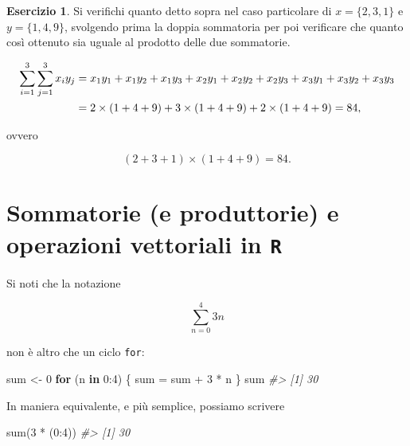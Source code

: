 \documentclass[
  11pt,
]{krantz}
\makeatletter
\newenvironment{Shaded}{\begin{snugshade}}{\end{snugshade}}
\newcommand{\CommentTok}[1]{\textcolor[rgb]{0.37,0.37,0.37}{\textit{#1}}}
\newcommand{\ControlFlowTok}[1]{\textcolor[rgb]{0.27,0.27,0.27}{\textbf{#1}}}
\newcommand{\DecValTok}[1]{\textcolor[rgb]{0.06,0.06,0.06}{#1}}
\newcommand{\FunctionTok}[1]{\textcolor[rgb]{0,0,0}{#1}}
\newcommand{\NormalTok}[1]{#1}
\newcommand{\OtherTok}[1]{\textcolor[rgb]{0.37,0.37,0.37}{#1}}
\newcommand{\SpecialCharTok}[1]{\textcolor[rgb]{0,0,0}{#1}}
\newenvironment{kframe}{%
\medskip{}
\setlength{\fboxsep}{.8em}
 \def\at@end@of@kframe{}%
 \ifinner\ifhmode%
  \def\at@end@of@kframe{\end{minipage}}%
  \begin{minipage}{\columnwidth}%
 \fi\fi%
 \def\FrameCommand##1{\hskip\@totalleftmargin \hskip-\fboxsep
 \colorbox{shadecolor}{##1}\hskip-\fboxsep
     \hskip-\linewidth \hskip-\@totalleftmargin \hskip\columnwidth}%
 \MakeFramed {\advance\hsize-\width
   \@totalleftmargin\z@ \linewidth\hsize
   \@setminipage}}%
 {\par\unskip\endMakeFramed%
 \at@end@of@kframe}
\renewenvironment{Shaded}{\begin{kframe}}{\end{kframe}}
\theoremstyle{definition}
\theoremstyle{definition}
\theoremstyle{definition}
\newtheorem{exercise}{Esercizio}[chapter]
\theoremstyle{definition}
\theoremstyle{remark}
\makeatother
\begin{document}
\begin{exercise}
Si verifichi quanto detto sopra nel caso particolare di \(x = \{2, 3, 1\}\) e \(y = \{1, 4, 9\}\), svolgendo prima la doppia sommatoria per poi verificare che quanto così ottenuto sia uguale al prodotto delle due sommatorie.

\begin{align}
\sum_{i=1}^3 \sum_{j=1}^3 x_i y_j &= x_1y_1 + x_1y_2 + x_1y_3 + 
x_2y_1 + x_2y_2 + x_2y_3 + 
x_3y_1 + x_3y_2 + x_3y_3 \notag\\
&= 2 \times (1+4+9) + 3 \times (1+4+9) + 2 \times (1+4+9) = 84,\notag
\end{align}

ovvero

\[
(2 + 3 + 1) \times (1+4+9) = 84.
\]
\end{exercise}

\hypertarget{sommatorie-e-produttorie-e-operazioni-vettoriali-in-r}{%
\section{\texorpdfstring{Sommatorie (e produttorie) e operazioni vettoriali in \texttt{R}}{Sommatorie (e produttorie) e operazioni vettoriali in R}}\label{sommatorie-e-produttorie-e-operazioni-vettoriali-in-r}}

Si noti che la notazione

\[
\sum_{n=0}^4 3n
\]

non è altro che un ciclo \texttt{for}:

\begin{Shaded}
\begin{Highlighting}[]
\NormalTok{sum }\OtherTok{\textless{}{-}} \DecValTok{0}
\ControlFlowTok{for}\NormalTok{ (n }\ControlFlowTok{in} \DecValTok{0}\SpecialCharTok{:}\DecValTok{4}\NormalTok{) \{}
\NormalTok{  sum }\OtherTok{=}\NormalTok{ sum }\SpecialCharTok{+} \DecValTok{3} \SpecialCharTok{*}\NormalTok{ n}
\NormalTok{\}}
\NormalTok{sum}
\CommentTok{\#\textgreater{} [1] 30}
\end{Highlighting}
\end{Shaded}

In maniera equivalente, e più semplice, possiamo scrivere

\begin{Shaded}
\begin{Highlighting}[]
\FunctionTok{sum}\NormalTok{(}\DecValTok{3} \SpecialCharTok{*}\NormalTok{ (}\DecValTok{0}\SpecialCharTok{:}\DecValTok{4}\NormalTok{))}
\CommentTok{\#\textgreater{} [1] 30}
\end{Highlighting}
\end{Shaded}
\end{document}
